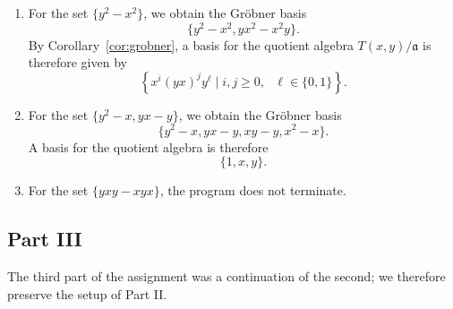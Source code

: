 \begin{enumerate}
	\item For the set $\{y^2-x^2\}$, we obtain the Gr\"obner basis
	\begin{equation*}
		\{y^2-x^2,yx^2-x^2y\}.
	\end{equation*}
    By Corollary~\ref{cor:grobner}, a basis for the quotient algebra $T(x,y)/\mathfrak{a}$ is therefore given by
    \begin{equation}
      \label{eqn:basisone}
    \left\{x^i(yx)^jy^\ell\mid i,j\ge 0,\text{ }\ell\in\{0,1\}\right\}.
    \end{equation}
	\item For the set $\{y^2-x,yx-y\}$, we obtain the Gr\"obner basis
    \begin{equation*}
      \{y^2 - x,yx - y,xy - y,x^2 - x\}.
    \end{equation*}
    A basis for the quotient algebra is therefore
    \begin{equation*}
      \{1,x,y\}.
    \end{equation*}
    \item For the set $\{yxy-xyx\}$, the program does not terminate.
\end{enumerate}

\subsection*{Part III}

The third part of the assignment was a continuation of the second; we therefore preserve the setup of Part II.

